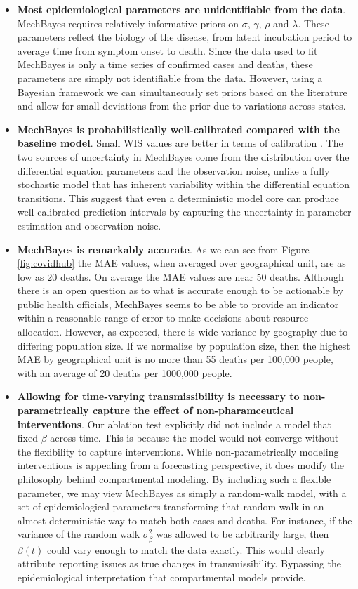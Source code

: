 \documentclass[11pt]{amsart}
\begin{document}
\begin{itemize}
\item \textbf{Most epidemiological parameters are unidentifiable from the data}. MechBayes requires relatively informative priors on $\sigma$, $\gamma$, $\rho$ and $\lambda$. These parameters reflect the biology of the disease, from latent incubation period to average time from symptom onset to death. Since the data used to fit MechBayes is only a time series of confirmed cases and deaths, these parameters are simply not identifiable from the data. However, using a Bayesian framework we can simultaneously set priors based on the literature and allow for small deviations from the prior due to variations across states. 

\item \textbf{MechBayes is probabilistically well-calibrated compared with the baseline model}. Small WIS values are better in terms of calibration \cite{bracher2020evaluating}. The two sources of uncertainty in MechBayes come from the distribution over the differential equation parameters and the observation noise, unlike a fully stochastic model that has inherent variability within the differential equation transitions. This suggest that even a deterministic model core can produce well calibrated prediction intervals by capturing the uncertainty in parameter estimation and observation noise. 



\item \textbf{MechBayes is remarkably accurate}. As we can see from Figure \ref{fig:covidhub} the MAE values, when averaged over geographical unit, are as low as 20 deaths. On average the MAE values are near 50 deaths. Although there is an open question as to what is accurate enough to be actionable by public health officials, MechBayes seems to be able to provide an indicator within a reasonable range of error to make decisions about resource allocation. However, as expected, there is wide variance by geography due to differing population size. If we normalize by population size, then the highest MAE by geographical unit is no more than 55 deaths per 100,000 people, with an average of 20 deaths per 1000,000 people.

\item \textbf{Allowing for time-varying transmissibility is necessary to non-parametrically capture the effect of non-pharamceutical interventions}. Our ablation test explicitly did not include a model that fixed $\beta$ across time. This is because the model would not converge without the flexibility to capture interventions. While non-parametrically modeling interventions is appealing from a forecasting perspective, it does modify the philosophy behind compartmental modeling. By including such a flexible parameter, we may view MechBayes as simply a random-walk model, with a set of epidemiological parameters transforming that random-walk in an almost deterministic way to match both cases and deaths. For instance, if the variance of the random walk $\sigma_{\beta}^2$ was allowed to be arbitrarily large, then $\beta(t)$ could vary enough to match the data exactly. This would clearly attribute reporting issues as true changes in transmissibility. Bypassing the epidemiological interpretation that compartmental models provide. 



\end{itemize}
\end{document}
